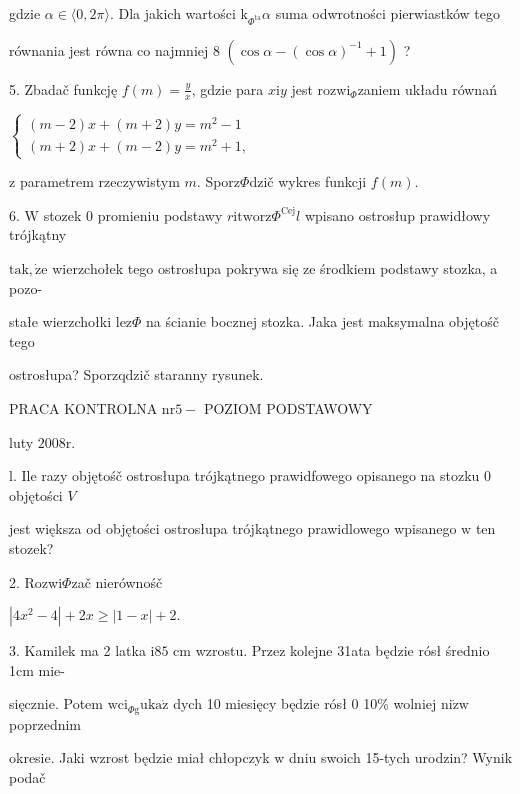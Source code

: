 \documentclass[a4paper,12pt]{article}
\begin{document}
gdzie $\alpha \in \langle 0,  2\pi\rangle$. Dla jakich wartości $\mathrm{k}_{\Phi^{\mathrm{t}\mathrm{a}}}\alpha$ suma odwrotności pierwiastków tego

równania jest równa co najmniej 8 $(\cos\alpha-(\cos\alpha)^{-1}+1)$ ?

5. Zbadač funkcję $f(m)=\displaystyle \frac{y}{x}$, gdzie para $x\mathrm{i}y$ jest $\mathrm{r}\mathrm{o}\mathrm{z}\mathrm{w}\mathrm{i}_{\Phi}$zaniem układu równań

$\left\{\begin{array}{l}
(m-2)x+(m+2)y=m^{2}-1\\
(m+2)x+(m-2)y=m^{2}+1,
\end{array}\right.$

$\mathrm{z}$ parametrem rzeczywistym $m$. Sporz$\Phi$dzič wykres funkcji $f(m).$

6. $\mathrm{W}$ stozek $0$ promieniu podstawy $r\mathrm{i}\mathrm{t}\mathrm{w}\mathrm{o}\mathrm{r}\mathrm{z}\Phi^{\mathrm{C}\mathrm{e}\mathrm{j}}l$ wpisano ostrosłup prawidłowy trójkątny

$\mathrm{t}\mathrm{a}\mathrm{k}, \dot{\mathrm{z}}\mathrm{e}$ wierzchołek tego ostrosłupa pokrywa się ze środkiem podstawy stozka, a pozo-

stałe wierzchołki $\mathrm{l}\mathrm{e}\mathrm{z}\Phi$ na ścianie bocznej stozka. Jaka jest maksymalna objętośč tego

ostrosłupa? Sporzqdzič staranny rysunek.





PRACA KONTROLNA $\mathrm{n}\mathrm{r}5-$ POZIOM PODSTAWOWY

luty $2008\mathrm{r}.$

l. Ile razy objętośč ostrosłupa trójkątnego prawidfowego opisanego na stozku $0$ objętości $V$

jest większa od objętości ostrosłupa trójkątnego prawidlowego wpisanego $\mathrm{w}$ ten stozek?

2. Rozwi$\Phi$zač nierównośč

$|4x^{2}-4|+2x\geq|1-x|+2.$

3. Kamilek ma 2 latka $\mathrm{i}85$ cm wzrostu. Przez kolejne 31ata będzie rósł średnio 1cm mie-

sięcznie. Potem $\mathrm{w}\mathrm{c}\mathrm{i}_{\Phi \mathrm{g}}\mathrm{u}\mathrm{k}\mathrm{a}\dot{\mathrm{z}}$ dych 10 miesięcy będzie rósł $0$ 10\% wolniej $\mathrm{n}\mathrm{i}\dot{\mathrm{z}}\mathrm{w}$ poprzednim

okresie. Jaki wzrost będzie miał chłopczyk $\mathrm{w}$ dniu swoich 15-tych urodzin? Wynik podač
\end{document}
